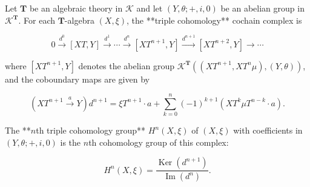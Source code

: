 Let $\mathbf{T}$ be an algebraic theory in $\mathcal{K}$ and let $(Y, \theta; +, i, 0)$ be an abelian group in $\mathcal{K}^{\mathbf{T}}$. For each $\mathbf{T}$-algebra $(X, \xi)$, the **triple cohomology** cochain complex is

$$0 \xrightarrow{d^0} [XT, Y] \xrightarrow{d^1} \cdots \xrightarrow{d^n} [XT^{n+1}, Y] \xrightarrow{d^{n+1}} [XT^{n+2}, Y] \rightarrow \cdots$$

where $[XT^{n+1}, Y]$ denotes the abelian group $\mathcal{K}^{\mathbf{T}}((XT^{n+1}, XT^n \mu), (Y, \theta))$, and the coboundary maps are given by

$$(XT^{n+1} \xrightarrow{a} Y) d^{n+1} = \xi T^{n+1} \cdot a + \sum_{k=0}^{n} (-1)^{k+1}(XT^k \mu T^{n-k} \cdot a).$$

The **$n$th triple cohomology group** $H^n(X, \xi)$ of $(X, \xi)$ with coefficients in $(Y, \theta; +, i, 0)$ is the $n$th cohomology group of this complex:

$$H^n(X, \xi) = \frac{\operatorname{Ker}(d^{n+1})}{\operatorname{Im}(d^n)}.$$
